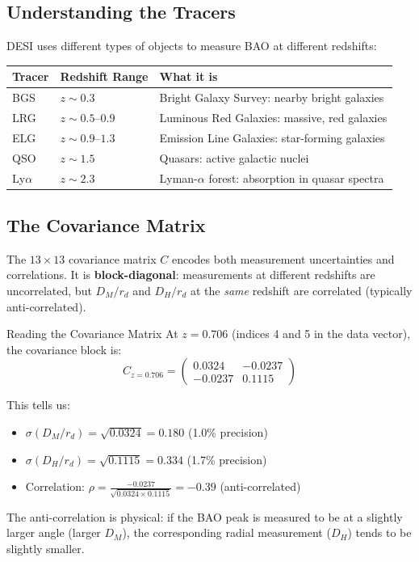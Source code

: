 \documentclass[11pt,a4paper]{article}
\begin{document}
\subsection{Understanding the Tracers}

DESI uses different types of objects to measure BAO at different redshifts:

\begin{center}
\begin{tabular}{llp{7cm}}
\toprule
\textbf{Tracer} & \textbf{Redshift Range} & \textbf{What it is} \\
\midrule
BGS & $z \sim 0.3$ & Bright Galaxy Survey: nearby bright galaxies \\
LRG & $z \sim 0.5$--$0.9$ & Luminous Red Galaxies: massive, red galaxies \\
ELG & $z \sim 0.9$--$1.3$ & Emission Line Galaxies: star-forming galaxies \\
QSO & $z \sim 1.5$ & Quasars: active galactic nuclei \\
Ly$\alpha$ & $z \sim 2.3$ & Lyman-$\alpha$ forest: absorption in quasar spectra \\
\bottomrule
\end{tabular}
\end{center}

\subsection{The Covariance Matrix}
\label{sec:covariance}

The $13 \times 13$ covariance matrix $C$ encodes both measurement uncertainties and correlations. It is \textbf{block-diagonal}: measurements at different redshifts are uncorrelated, but $D_M/r_d$ and $D_H/r_d$ at the \textit{same} redshift are correlated (typically anti-correlated).

\begin{examplebox}{Reading the Covariance Matrix}
At $z = 0.706$ (indices 4 and 5 in the data vector), the covariance block is:
$$C_{z=0.706} = \begin{pmatrix} 0.0324 & -0.0237 \\ -0.0237 & 0.1115 \end{pmatrix}$$

This tells us:
\begin{itemize}
    \item $\sigma(D_M/r_d) = \sqrt{0.0324} = 0.180$ (1.0\% precision)
    \item $\sigma(D_H/r_d) = \sqrt{0.1115} = 0.334$ (1.7\% precision)
    \item Correlation: $\rho = \frac{-0.0237}{\sqrt{0.0324 \times 0.1115}} = -0.39$ (anti-correlated)
\end{itemize}
The anti-correlation is physical: if the BAO peak is measured to be at a slightly larger angle (larger $D_M$), the corresponding radial measurement ($D_H$) tends to be slightly smaller.
\end{examplebox}
\end{document}

